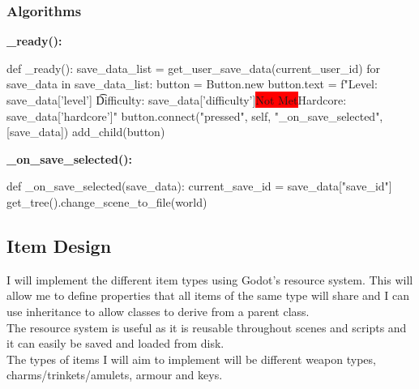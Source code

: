 \documentclass{article}
\newcommand{\red}[1]{\colorbox{red}{#1}}
\newcommand{\n}[0]{\red{Not Met}}
\begin{document}
        \subsubsection{Algorithms}
        \textbf{\_ready():}
        \begin{python}
def _ready():
   save_data_list = get_user_save_data(current_user_id)
   for save_data in save_data_list:
      button = Button.new
      button.text = f"Level: {save_data['level']} \t Difficulty: {save_data['difficulty']}\n Hardcore: {save_data['hardcore']}"
      button.connect("pressed", self, "_on_save_selected", [save_data])
      add_child(button)
        \end{python}
        \textbf{\_on\_save\_selected():}
        \begin{python}
def _on_save_selected(save_data):
   current_save_id = save_data["save_id"]
   get_tree().change_scene_to_file(world)
        \end{python}
        \subsection{Item Design}
        I will implement the different item types using Godot's resource system. This will allow me to define properties that all items of the same type will share and I can use inheritance to allow classes to derive from a parent class.\\
        The resource system is useful as it is reusable throughout scenes and scripts and it can easily be saved and loaded from disk.\\
        The types of items I will aim to implement will be different weapon types, charms/trinkets/amulets, armour and keys.\\
\end{document}
